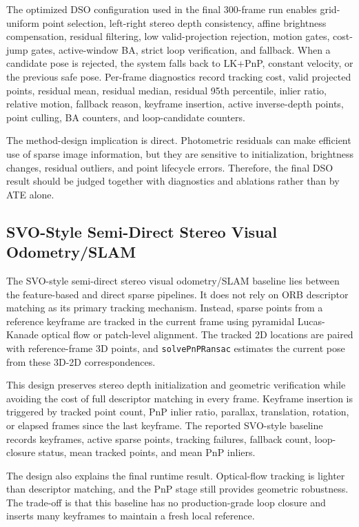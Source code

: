 \documentclass[11pt,a4paper]{article}
\newcommand{\methodsvo}{SVO-style semi-direct stereo visual odometry/SLAM}
\begin{document}
The optimized DSO configuration used in the final 300-frame run enables grid-uniform point selection, left-right stereo depth consistency, affine brightness compensation, residual filtering, low valid-projection rejection, motion gates, cost-jump gates, active-window BA, strict loop verification, and fallback. When a candidate pose is rejected, the system falls back to LK+PnP, constant velocity, or the previous safe pose. Per-frame diagnostics record tracking cost, valid projected points, residual mean, residual median, residual 95th percentile, inlier ratio, relative motion, fallback reason, keyframe insertion, active inverse-depth points, point culling, BA counters, and loop-candidate counters.

The method-design implication is direct. Photometric residuals can make efficient use of sparse image information, but they are sensitive to initialization, brightness changes, residual outliers, and point lifecycle errors. Therefore, the final DSO result should be judged together with diagnostics and ablations rather than by ATE alone.

\subsection{SVO-Style Semi-Direct Stereo Visual Odometry/SLAM}

The \methodsvo{} baseline lies between the feature-based and direct sparse pipelines. It does not rely on ORB descriptor matching as its primary tracking mechanism. Instead, sparse points from a reference keyframe are tracked in the current frame using pyramidal Lucas-Kanade optical flow or patch-level alignment. The tracked 2D locations are paired with reference-frame 3D points, and \texttt{solvePnPRansac} estimates the current pose from these 3D-2D correspondences.

This design preserves stereo depth initialization and geometric verification while avoiding the cost of full descriptor matching in every frame. Keyframe insertion is triggered by tracked point count, PnP inlier ratio, parallax, translation, rotation, or elapsed frames since the last keyframe. The reported SVO-style baseline records keyframes, active sparse points, tracking failures, fallback count, loop-closure status, mean tracked points, and mean PnP inliers.

The design also explains the final runtime result. Optical-flow tracking is lighter than descriptor matching, and the PnP stage still provides geometric robustness. The trade-off is that this baseline has no production-grade loop closure and inserts many keyframes to maintain a fresh local reference.
\end{document}
